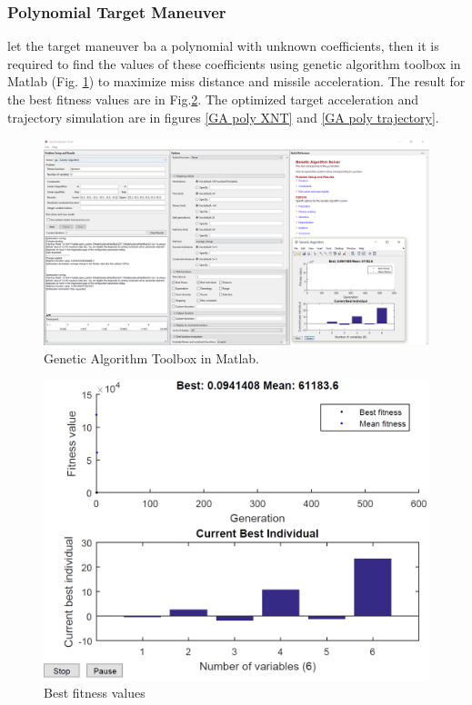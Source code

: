 \subsubsection{Polynomial Target Maneuver}
let the target maneuver ba a polynomial with unknown coefficients, then it is required to find the values of these coefficients using genetic algorithm toolbox in Matlab (Fig. \ref{GA toolbox poly}) to maximize miss distance and missile acceleration. The result for the best fitness values are in Fig.\ref{GA poly F}. The optimized target acceleration and trajectory simulation are in figures \ref{GA poly XNT} and \ref{GA poly trajectory}. 

\begin{figure}[H]
	\centering
	\includegraphics[scale = 0.4]{fig/GApoly.PNG}
	\caption{Genetic Algorithm Toolbox in Matlab.}
	\label{GA toolbox poly}
\end{figure}

\begin{figure}[H]
	\centering
	\includegraphics[scale = 0.4]{fig/GApolyF.PNG}
	\caption{Best fitness values}
	\label{GA poly F}
\end{figure}

